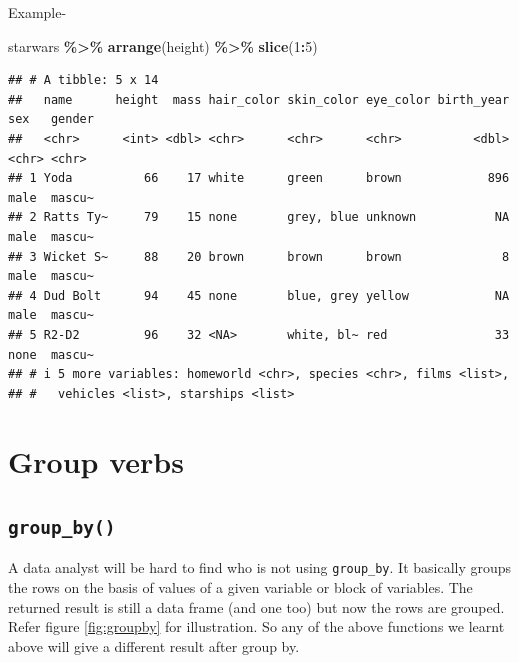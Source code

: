 \documentclass[
]{book}
\newenvironment{Shaded}{\begin{snugshade}}{\end{snugshade}}
\newcommand{\DecValTok}[1]{\textcolor[rgb]{0.00,0.00,0.81}{#1}}
\newcommand{\FunctionTok}[1]{\textcolor[rgb]{0.13,0.29,0.53}{\textbf{#1}}}
\newcommand{\NormalTok}[1]{#1}
\newcommand{\SpecialCharTok}[1]{\textcolor[rgb]{0.81,0.36,0.00}{\textbf{#1}}}
\begin{document}
Example-

\begin{Shaded}
\begin{Highlighting}[]
\NormalTok{starwars }\SpecialCharTok{\%\textgreater{}\%} 
  \FunctionTok{arrange}\NormalTok{(height) }\SpecialCharTok{\%\textgreater{}\%} 
  \FunctionTok{slice}\NormalTok{(}\DecValTok{1}\SpecialCharTok{:}\DecValTok{5}\NormalTok{)}
\end{Highlighting}
\end{Shaded}

\begin{verbatim}
## # A tibble: 5 x 14
##   name      height  mass hair_color skin_color eye_color birth_year sex   gender
##   <chr>      <int> <dbl> <chr>      <chr>      <chr>          <dbl> <chr> <chr> 
## 1 Yoda          66    17 white      green      brown            896 male  mascu~
## 2 Ratts Ty~     79    15 none       grey, blue unknown           NA male  mascu~
## 3 Wicket S~     88    20 brown      brown      brown              8 male  mascu~
## 4 Dud Bolt      94    45 none       blue, grey yellow            NA male  mascu~
## 5 R2-D2         96    32 <NA>       white, bl~ red               33 none  mascu~
## # i 5 more variables: homeworld <chr>, species <chr>, films <list>,
## #   vehicles <list>, starships <list>
\end{verbatim}

\hypertarget{group-verbs}{%
\section{Group verbs}\label{group-verbs}}

\hypertarget{group_by}{%
\subsection{\texorpdfstring{\texttt{group\_by()}}{group\_by()}}\label{group_by}}

A data analyst will be hard to find who is not using \texttt{group\_by}. It basically groups the rows on the basis of values of a given variable or block of variables. The returned result is still a data frame (and one too) but now the rows are grouped. Refer figure \ref{fig:groupby} for illustration. So any of the above functions we learnt above will give a different result after group by.
\end{document}
